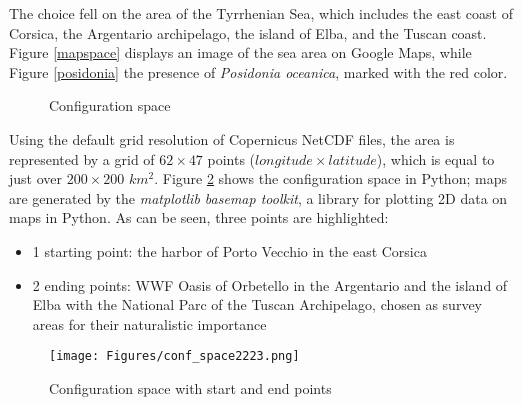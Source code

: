 The choice fell on the area of the Tyrrhenian Sea, which includes the east coast of Corsica, the Argentario archipelago, the island of Elba, and the Tuscan coast. Figure \ref{mapspace} displays an image of the sea area on Google Maps, while Figure \ref{posidonia} the presence of \textit{Posidonia oceanica}, marked with the red color.

\begin{figure}[h]
	\centering 
	\hspace{0.3cm}
	\caption{Configuration space}
	\label{Configuration spac}
\end{figure} 

Using the default grid resolution of Copernicus NetCDF files, the area is represented by a grid of $62\times47$ points ($longitude\times latitude$), which is equal to just over $200\times200$ $km^2$.
Figure \ref{startend} shows the configuration space in Python; maps are generated by the \textit{matplotlib basemap toolkit}, a library for plotting 2D data on maps in Python. As can be seen, three points are highlighted:
\begin{itemize}[itemsep=0pt]
	\item 1 starting point: the harbor of Porto Vecchio in the east Corsica
	\item 2 ending points: WWF Oasis of Orbetello in the Argentario and the island of Elba with the National Parc of the Tuscan Archipelago, chosen as survey areas for their naturalistic importance
\end{itemize}
\begin{figure}[H]
	\centering
	\texttt{[image: Figures/conf\_space2223.png]}
	\caption{Configuration space with start and end points}
	\label{startend}
\end{figure} 
